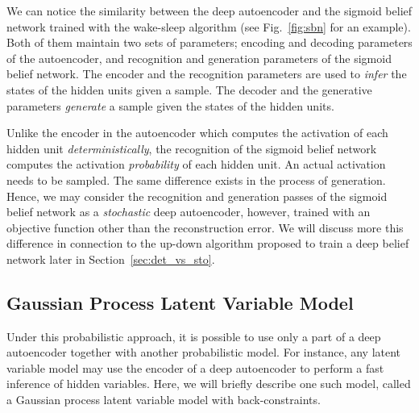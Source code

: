 \documentclass[dissertation,nocontribution]{aaltoseries}
\begin{document}
We can notice the similarity between the deep
autoencoder and the sigmoid belief network trained with the
wake-sleep algorithm (see Fig.~\ref{fig:sbn} for an
example). Both of them maintain two sets of parameters;
encoding and decoding parameters of the autoencoder, and
recognition and generation parameters of the sigmoid belief
network. The encoder and the recognition parameters are
used to \textit{infer} the states of the hidden units given
a sample. The decoder and the generative parameters
\textit{generate} a sample given the states of the hidden
units.

Unlike the encoder in the autoencoder which
computes the activation of each hidden unit
\textit{deterministically}, the recognition of the sigmoid
belief network computes the activation \textit{probability}
of each hidden unit. An actual activation needs to be
sampled. The same difference exists in the process of
generation. Hence, we may consider the recognition and
generation passes of the sigmoid belief network as a
\textit{stochastic} deep autoencoder, however, trained with an
objective function other than the reconstruction error.
We will discuss more this difference in connection to
the up-down algorithm proposed to train a deep belief
network \citep{Hinton2006nc} later in
Section~\ref{sec:det_vs_sto}.

%

\subsection{Gaussian Process Latent Variable Model}

Under this probabilistic approach, it is possible to use
only a
part of a deep autoencoder together with another
probabilistic model. For instance, any latent variable model
may use the encoder of a deep autoencoder to perform a fast
inference of hidden variables. Here, we will briefly
describe one such model, called a Gaussian process latent
variable model with back-constraints.
\end{document}
